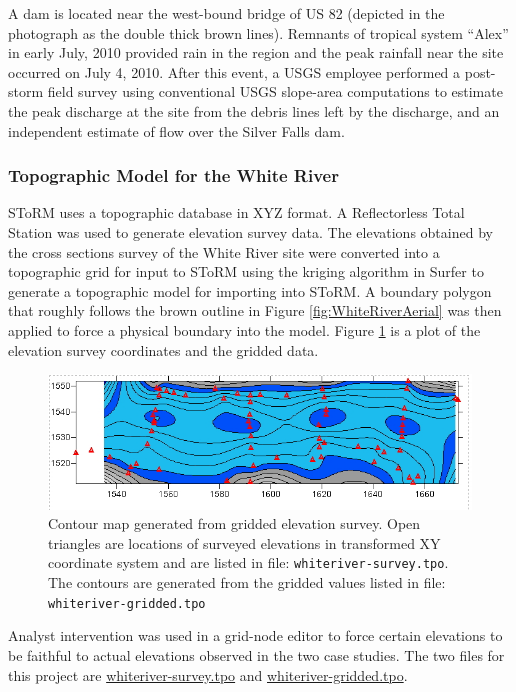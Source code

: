 \documentclass[12pt]{article}
\begin{document}
A dam is located near the west-bound bridge of US 82 (depicted in the photograph as the double thick brown lines).  
Remnants of tropical system ``Alex'' in early July, 2010 provided rain in the region and the peak rainfall near the site occurred on July 4, 2010.   
After this event, a USGS employee performed a post-storm field survey using conventional USGS slope-area computations to estimate the peak discharge at the site from the debris lines left by the discharge, and an independent estimate of flow over the Silver Falls dam.

\subsubsection*{Topographic Model for the White River}
SToRM uses a topographic database in XYZ format.   A Reflectorless Total Station was used to generate elevation survey data.
The elevations obtained by the cross sections survey of the White River site were converted into a topographic grid for input to SToRM using the kriging algorithm in Surfer \citep{surfer2010} to generate a topographic model for importing into SToRM.   A boundary polygon that roughly follows the brown outline in Figure \ref{fig:WhiteRiverAerial} was then applied to force a physical boundary into the model.    Figure \ref{fig:white-river-elevation-image} is a plot of the elevation survey coordinates and the gridded data.  
\begin{figure}[htbp] %
   \centering
   \includegraphics[width=6in]{white-river-elevation-image.jpg} 
   \caption{Contour map generated from gridded elevation survey.   
   Open triangles are locations of surveyed elevations in transformed XY coordinate system and are listed in
   file: \texttt{whiteriver-survey.tpo}. The contours are generated from the gridded values listed in file: \texttt{whiteriver-gridded.tpo} }
   \label{fig:white-river-elevation-image}
\end{figure}
  Analyst intervention was used in a grid-node editor to force certain elevations to be faithful to actual elevations observed in the two case studies. 
The two files for this project are \url{whiteriver-survey.tpo} and \url{whiteriver-gridded.tpo}.
\end{document}
